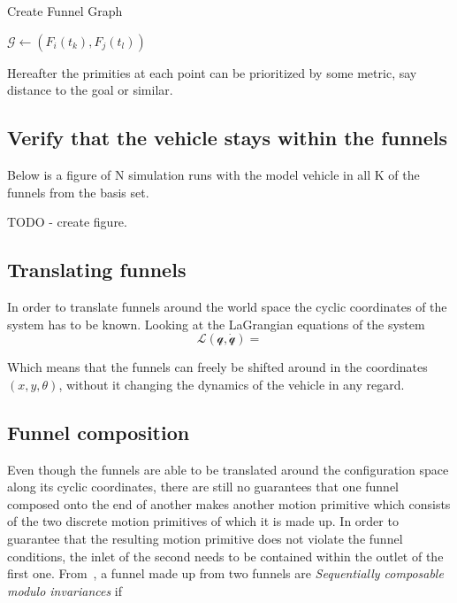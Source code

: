 \begin{algorithm}
  \caption{Create Funnel Graph}
  \label{alg:create-funnel-graph}
  \DontPrintSemicolon \SetAlgoNoLine

   

   {  {
       {  {
           { \(\mathcal{G}
            \leftarrow{} \left( F_{i}(t_{k}), F_{j}(t_{l}) \right)\) } \; } \; }
      \; }\; }\;

\end{algorithm}

Hereafter the primities at each point can be prioritized by some metric, say
distance to the goal or similar.

\subsection{Verify that the vehicle stays within the funnels}

Below is a figure of N simulation runs with the model vehicle in all K of the
funnels from the basis set.

TODO - create figure.

\subsection{Translating funnels}

In order to translate funnels around the world space the cyclic coordinates of
the system has to be known. Looking at the LaGrangian equations of the system
\begin{equation}
  \mathcal{L(q,\dot{q})} = 
\end{equation}

Which means that the funnels can freely be shifted around in the coordinates
\(\left( x, y, \theta \right)\), without it changing the dynamics of the vehicle
in any regard.

\subsection{Funnel composition}

Even though the funnels are able to be translated around the configuration space
along its cyclic coordinates, there are still no guarantees that one funnel
composed onto the end of another makes another motion primitive which consists
of the two discrete motion primitives of which it is made up. In order to
guarantee that the resulting motion primitive does not violate the funnel
conditions, the inlet of the second needs to be contained within the outlet of
the first one. From~\cite[Majumdar]{majumdarFunnelLibrariesRealtime2017}, a
funnel made up from two funnels are \textit{Sequentially composable modulo
  invariances} if

